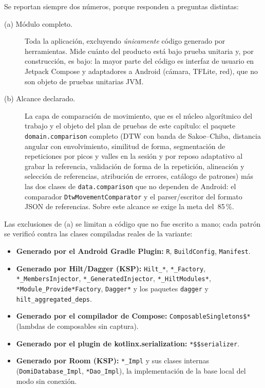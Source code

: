 Se reportan siempre dos números, porque responden a preguntas distintas:

\begin{description}
  \item[(a) Módulo completo.] Toda la aplicación, excluyendo \emph{únicamente} código
    generado por herramientas. Mide cuánto del producto está bajo prueba unitaria y, por
    construcción, es bajo: la mayor parte del código es interfaz de usuario en Jetpack
    Compose y adaptadores a Android (cámara, TFLite, red), que no son objeto de pruebas
    unitarias JVM.
  \item[(b) Alcance declarado.] La capa de comparación de movimiento, que es el núcleo
    algorítmico del trabajo y el objeto del plan de pruebas de este capítulo: el paquete
    \texttt{domain.comparison} completo (DTW con banda de Sakoe--Chiba, distancia angular
    con envolvimiento, similitud de forma, segmentación de repeticiones por picos y
    valles en la sesión y por reposo adaptativo al grabar la referencia, validación de
    forma de la repetición, alineación y selección de referencias, atribución de errores,
    catálogo de patrones) más las dos clases de \texttt{data.comparison} que no dependen de Android:
    el comparador \texttt{DtwMovementComparator} y el parser/escritor del formato JSON de
    referencias. Sobre este alcance se exige la meta del~85\,\%.
\end{description}

Las exclusiones de (a) se limitan a código que no fue escrito a mano; cada patrón se
verificó contra las clases compiladas reales de la variante:

\begin{itemize}
  \item \textbf{Generado por el Android Gradle Plugin:} \texttt{R}, \texttt{BuildConfig},
    \texttt{Manifest}.
  \item \textbf{Generado por Hilt/Dagger (KSP):} \texttt{Hilt\_*}, \texttt{*\_Factory},
    \texttt{*\_MembersInjector}, \texttt{*\_GeneratedInjector}, \texttt{*\_HiltModules*},
    \texttt{*Module\_Provide*Factory}, \texttt{Dagger*} y los paquetes \texttt{dagger} y
    \texttt{hilt\_aggregated\_deps}.
  \item \textbf{Generado por el compilador de Compose:} \texttt{ComposableSingletons\$*}
    (lambdas de composables sin captura).
  \item \textbf{Generado por el plugin de kotlinx.serialization:} \texttt{*\$\$serializer}.
  \item \textbf{Generado por Room (KSP):} \texttt{*\_Impl} y sus clases internas
    (\texttt{DomiDatabase\_Impl}, \texttt{*Dao\_Impl}), la implementación de la base local
    del modo sin conexión.
\end{itemize}


